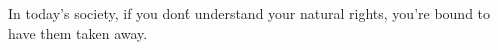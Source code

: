 
In today's society, if you don\'t understand your natural rights, you're bound to
have them taken away.





